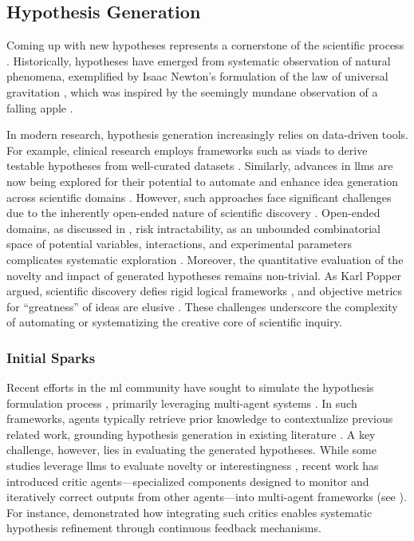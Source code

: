 \subsection{Hypothesis Generation} \label{sec:hypothesis-gen}

Coming up with new hypotheses represents a cornerstone of the scientific process \autocite{rock2018hypothesis}. Historically, hypotheses have emerged from systematic observation of natural phenomena, exemplified by Isaac Newton’s formulation of the law of universal gravitation \autocite{newton1999principia}, which was inspired by the seemingly mundane observation of a falling apple \autocite{kosso2017whatgoesup}.

In modern research, hypothesis generation increasingly relies on data-driven tools. 
For example, clinical research employs frameworks such as \gls{viads} to derive testable hypotheses from well-curated datasets \autocite{Jing2022roles}. Similarly, advances in \glspl{llm} are now being explored for their potential to automate and enhance idea generation across scientific domains \autocite{oneill2025sparks}. However, such approaches face significant challenges due to the inherently open-ended nature of scientific discovery \autocite{stanley2017openendedness}. 
Open-ended domains, as discussed in , risk intractability, as an unbounded combinatorial space of potential variables, interactions, and experimental parameters complicates systematic exploration \autocite{clune2019ai0gas0}.
Moreover, the quantitative evaluation of the novelty and impact of generated hypotheses remains non-trivial. 
As Karl Popper argued, scientific discovery defies rigid logical frameworks \autocite{popper1959logic}, and objective metrics for \enquote{greatness} of ideas are elusive \autocite{stanley2015greatness}. These challenges underscore the complexity of automating or systematizing the creative core of scientific inquiry.

\subsubsection{Initial Sparks}

Recent efforts in the \gls{ml} community have sought to simulate the hypothesis formulation process \autocite{Gu2025forecasting, arlt2024meta0designing}, primarily leveraging multi-agent systems \autocite{jansen2025codescientist0, kumbhar2025hypothesis}. 
In such frameworks, agents typically retrieve prior knowledge to contextualize previous related work, grounding hypothesis generation in existing literature \autocite{naumov2025dora, ghareeb2025robin0, gu2024interesting}. 
A key challenge, however, lies in evaluating the generated hypotheses. 
While some studies leverage \glspl{llm} to evaluate novelty or interestingness \autocite{zhang2024omni0}, recent work has introduced critic agents---specialized components designed to monitor and iteratively correct outputs from other agents---into multi-agent frameworks (see ). 
For instance, \textcite{Ghafarollahi2024} demonstrated how integrating such critics enables systematic hypothesis refinement through continuous feedback mechanisms.

